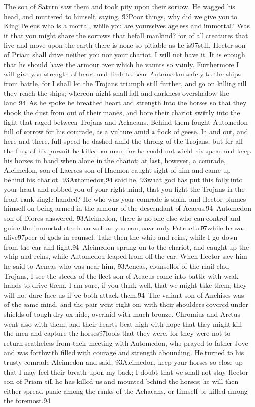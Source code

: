 {The son of Saturn saw them and took pity upon their sorrow. He wagged his head, and muttered to himself, saying, \'93Poor things, why did we give you to King Peleus who is a mortal, while you are yourselves ageless and immortal? Was it that you might share the sorrows that befall mankind? for of all creatures that live and move upon the earth there is none so pitiable as he is\'97still, Hector son of Priam shall drive neither you nor your chariot. I will not have it. It is enough that he should have the armour over which he vaunts so vainly. Furthermore I will give you strength of heart and limb to bear Automedon safely to the ships from battle, for I shall let the Trojans triumph still further, and go on killing till they reach the ships; whereon night shall fall and darkness overshadow the land.\'94\
As he spoke he breathed heart and strength into the horses so that they shook the dust from out of their manes, and bore their chariot swiftly into the fight that raged between Trojans and Achaeans. Behind them fought Automedon full of sorrow for his comrade, as a vulture amid a flock of geese. In and out, and here and there, full speed he dashed amid the throng of the Trojans, but for all the fury of his pursuit he killed no man, for he could not wield his spear and keep his horses in hand when alone in the chariot; at last, however, a comrade, Alcimedon, son of Laerces son of Haemon caught sight of him and came up behind his chariot. \'93Automedon,\'94 said he, \'93what god has put this folly into your heart and robbed you of your right mind, that you fight the Trojans in the front rank single-handed? He who was your comrade is slain, and Hector plumes himself on being armed in the armour of the descendant of Aeacus.\'94\
Automedon son of Diores answered, \'93Alcimedon, there is no one else who can control and guide the immortal steeds so well as you can, save only Patroclus\'97while he was alive\'97peer of gods in counsel. Take then the whip and reins, while I go down from the car and fight.\'94\
Alcimedon sprang on to the chariot, and caught up the whip and reins, while Automedon leaped from off the car. When Hector saw him he said to Aeneas who was near him, \'93Aeneas, counsellor of the mail-clad Trojans, I see the steeds of the fleet son of Aeacus come into battle with weak hands to drive them. I am sure, if you think well, that we might take them; they will not dare face us if we both attack them.\'94\
The valiant son of Anchises was of the same mind, and the pair went right on, with their shoulders covered under shields of tough dry ox-hide, overlaid with much bronze. Chromius and Aretus went also with them, and their hearts beat high with hope that they might kill the men and capture the horses\'97fools that they were, for they were not to return scatheless from their meeting with Automedon, who prayed to father Jove and was forthwith filled with courage and strength abounding. He turned to his trusty comrade Alcimedon and said, \'93Alcimedon, keep your horses so close up that I may feel their breath upon my back; I doubt that we shall not stay Hector son of Priam till he has killed us and mounted behind the horses; he will then either spread panic among the ranks of the Achaeans, or himself be killed among the foremost.\'94\
}

